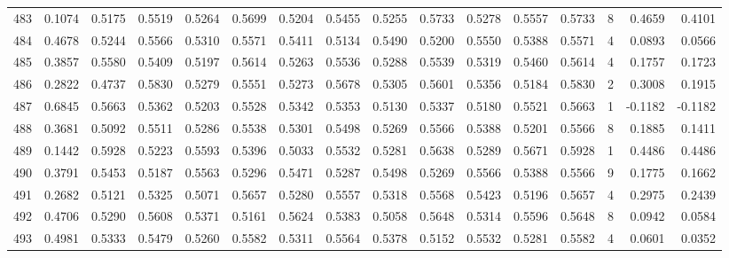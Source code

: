 \begin{tabular}{lrrrrrrrrrrrrrrr}
483 &      0.1074 &  0.5175 &  0.5519 &  0.5264 &  0.5699 &  0.5204 &  0.5455 &  0.5255 &  0.5733 &  0.5278 &   0.5557 &     0.5733 &      8 &                    0.4659 &                     0.4101 \\
484 &      0.4678 &  0.5244 &  0.5566 &  0.5310 &  0.5571 &  0.5411 &  0.5134 &  0.5490 &  0.5200 &  0.5550 &   0.5388 &     0.5571 &      4 &                    0.0893 &                     0.0566 \\
485 &      0.3857 &  0.5580 &  0.5409 &  0.5197 &  0.5614 &  0.5263 &  0.5536 &  0.5288 &  0.5539 &  0.5319 &   0.5460 &     0.5614 &      4 &                    0.1757 &                     0.1723 \\
486 &      0.2822 &  0.4737 &  0.5830 &  0.5279 &  0.5551 &  0.5273 &  0.5678 &  0.5305 &  0.5601 &  0.5356 &   0.5184 &     0.5830 &      2 &                    0.3008 &                     0.1915 \\
487 &      0.6845 &  0.5663 &  0.5362 &  0.5203 &  0.5528 &  0.5342 &  0.5353 &  0.5130 &  0.5337 &  0.5180 &   0.5521 &     0.5663 &      1 &                   -0.1182 &                    -0.1182 \\
488 &      0.3681 &  0.5092 &  0.5511 &  0.5286 &  0.5538 &  0.5301 &  0.5498 &  0.5269 &  0.5566 &  0.5388 &   0.5201 &     0.5566 &      8 &                    0.1885 &                     0.1411 \\
489 &      0.1442 &  0.5928 &  0.5223 &  0.5593 &  0.5396 &  0.5033 &  0.5532 &  0.5281 &  0.5638 &  0.5289 &   0.5671 &     0.5928 &      1 &                    0.4486 &                     0.4486 \\
490 &      0.3791 &  0.5453 &  0.5187 &  0.5563 &  0.5296 &  0.5471 &  0.5287 &  0.5498 &  0.5269 &  0.5566 &   0.5388 &     0.5566 &      9 &                    0.1775 &                     0.1662 \\
491 &      0.2682 &  0.5121 &  0.5325 &  0.5071 &  0.5657 &  0.5280 &  0.5557 &  0.5318 &  0.5568 &  0.5423 &   0.5196 &     0.5657 &      4 &                    0.2975 &                     0.2439 \\
492 &      0.4706 &  0.5290 &  0.5608 &  0.5371 &  0.5161 &  0.5624 &  0.5383 &  0.5058 &  0.5648 &  0.5314 &   0.5596 &     0.5648 &      8 &                    0.0942 &                     0.0584 \\
493 &      0.4981 &  0.5333 &  0.5479 &  0.5260 &  0.5582 &  0.5311 &  0.5564 &  0.5378 &  0.5152 &  0.5532 &   0.5281 &     0.5582 &      4 &                    0.0601 &                     0.0352 \\

\end{tabular}
